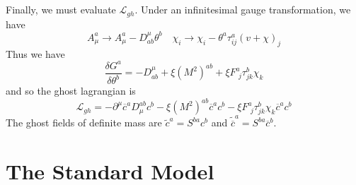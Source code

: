 \\ \\
Finally, we must evaluate $\mathcal{L}_{gh}$. Under an infinitesimal gauge transformation, we have
\[ A^a_{\mu} \to A^a_{\mu} - D^{\mu}_{ab}\theta^b \quad \chi_i \to \chi_i - \theta^a \tau^a_{ij}(v+\chi)_j \]
Thus we have
\[\frac{\delta G^a}{\delta \theta^b} = - D^{\mu}_{ab} + \xi(M^2)^{ab} + \xi F^a_{\phantom{i}j} \tau^b_{jk}\chi_k \]
and so the ghost lagrangian is
\[\mathcal{L}_{gh} = -\partial^{\mu} \overline{c}^a D_{\mu}^{ab} c^b - \xi (M^2)^{ab}\overline{c}^a c^b - \xi F^a_{\phantom{i}j} \tau^b_{jk}\chi_k \overline{c}^a c^b\]
The ghost fields of definite mass are $\widetilde{c}^a = S^{ba}c^b$ and  $\widetilde{\overline{c}}^a = S^{ba}\overline{c}^b$.

\section{The Standard Model}
